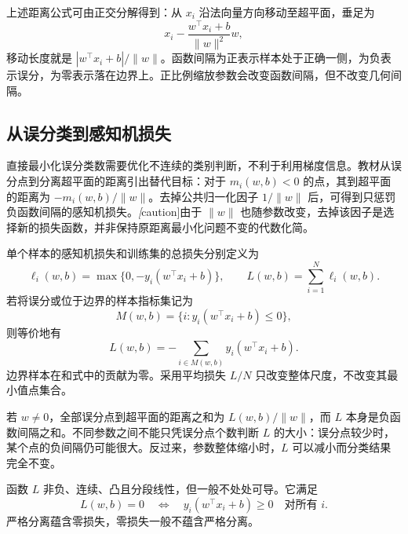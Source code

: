 上述距离公式可由正交分解得到：从 $x_i$ 沿法向量方向移动至超平面，垂足为
\[
x_i-\frac{w^\top x_i+b}{\|w\|^2}w,
\]
移动长度就是 $|w^\top x_i+b|/\|w\|$。函数间隔为正表示样本处于正确一侧，为负表示误分，为零表示落在边界上。正比例缩放参数会改变函数间隔，但不改变几何间隔。

\subsection{从误分类到感知机损失}
\label{subsec:lh-perceptron-loss}

直接最小化误分类数需要优化不连续的类别判断，不利于利用梯度信息。教材从误分点到分离超平面的距离引出替代目标：对于 $m_i(w,b)<0$ 的点，其到超平面的距离为 $-m_i(w,b)/\|w\|$。去掉公共归一化因子 $1/\|w\|$ 后，可得到只惩罚负函数间隔的感知机损失。\emph[caution]{由于 $\|w\|$ 也随参数改变，去掉该因子是选择新的损失函数，并非保持原距离最小化问题不变的代数化简。}

\begin{definition}[感知机损失]
\label{def:lh-perceptron-loss}
单个样本的感知机损失和训练集的总损失分别定义为
\begin{equation}
\label{eq:lh-perceptron-loss}
\ell_i(w,b)=\max\{0,-y_i(w^\top x_i+b)\},
\qquad
L(w,b)=\sum_{i=1}^{N}\ell_i(w,b).
\end{equation}
若将误分或位于边界的样本指标集记为
\[
M(w,b)=\{i:y_i(w^\top x_i+b)\leq0\},
\]
则等价地有
\begin{equation}
\label{eq:lh-perceptron-loss-active}
L(w,b)=-\sum_{i\in M(w,b)}y_i(w^\top x_i+b).
\end{equation}
边界样本在和式中的贡献为零。采用平均损失 $L/N$ 只改变整体尺度，不改变其最小值点集合。
\end{definition}

若 $w\neq0$，全部误分点到超平面的距离之和为 $L(w,b)/\|w\|$，而 $L$ 本身是负函数间隔之和。不同参数之间不能只凭误分点个数判断 $L$ 的大小：误分点较少时，某个点的负间隔仍可能很大。反过来，参数整体缩小时，$L$ 可以减小而分类结果完全不变。

\begin{proposition}[损失的基本性质]
\label{prop:lh-perceptron-loss-properties}
函数 $L$ 非负、连续、凸且分段线性，但一般不处处可导。它满足
\begin{equation}
\label{eq:lh-perceptron-zero-loss}
L(w,b)=0
\quad\Longleftrightarrow\quad
y_i(w^\top x_i+b)\geq0\quad\text{对所有 }i.
\end{equation}
严格分离蕴含零损失，零损失一般不蕴含严格分离。
\end{proposition}


